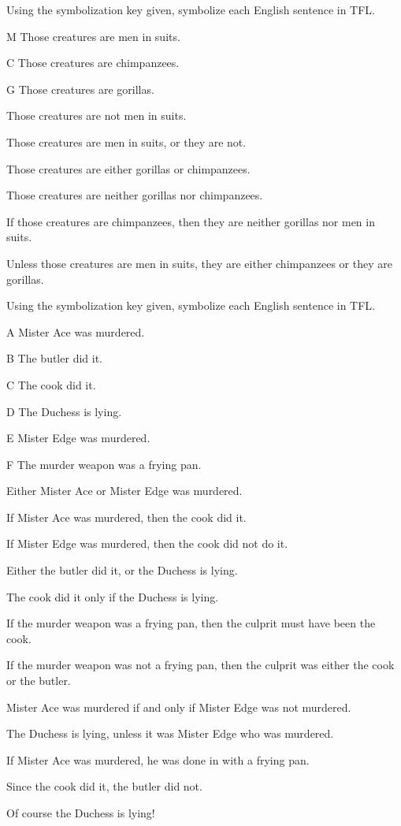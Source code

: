 \practiceproblems
\solutions
\problempart Using the symbolization key given, symbolize each English sentence in TFL.\label{pr.monkeysuits}
	\begin{ekey}
		\item[M] Those creatures are men in suits.
		\item[C] Those creatures are chimpanzees.
		\item[G] Those creatures are gorillas.
	\end{ekey}
\begin{earg}
\item Those creatures are not men in suits.
\item Those creatures are men in suits, or they are not.
\item Those creatures are either gorillas or chimpanzees.
\item Those creatures are neither gorillas nor chimpanzees.
\item If those creatures are chimpanzees, then they are neither gorillas nor men in suits.
\item Unless those creatures are men in suits, they are either chimpanzees or they are gorillas.
\end{earg}

\problempart Using the symbolization key given, symbolize each English sentence in TFL.
\begin{ekey}
\item[A] Mister Ace was murdered.
\item[B] The butler did it.
\item[C] The cook did it.
\item[D] The Duchess is lying.
\item[E] Mister Edge was murdered.
\item[F] The murder weapon was a frying pan.
\end{ekey}
\begin{earg}
\item Either Mister Ace or Mister Edge was murdered.
\item If Mister Ace was murdered, then the cook did it.
\item If Mister Edge was murdered, then the cook did not do it.
\item Either the butler did it, or the Duchess is lying.
\item The cook did it only if the Duchess is lying.
\item If the murder weapon was a frying pan, then the culprit must have been the cook.
\item If the murder weapon was not a frying pan, then the culprit was either the cook or the butler.
\item Mister Ace was murdered if and only if Mister Edge was not murdered.
\item The Duchess is lying, unless it was Mister Edge who was murdered.
\item If Mister Ace was murdered, he was done in with a frying pan.
\item Since the cook did it, the butler did not.
\item Of course the Duchess is lying!
\end{earg}
\solutions

